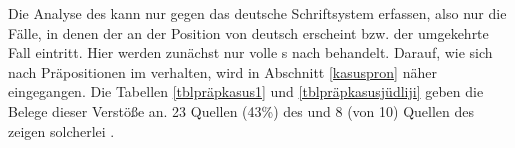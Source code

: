 Die Analyse des \hai{{\LiJi}} kann nur  gegen das deutsche Schriftsystem erfassen, also nur die Fälle, in denen der  an der Position von deutsch  erscheint bzw. der umgekehrte Fall eintritt. Hier werden zunächst nur volle \hai{{\NP}}s nach  behandelt. Darauf, wie sich  nach Präpositionen im \hai{{\LiJi}} verhalten, wird in Abschnitt \ref{kasuspron} näher eingegangen. Die Tabellen \ref{tblpräpkasus1} und \ref{tblpräpkasusjüdliji}  
geben die Belege dieser Verstöße an. 23 Quellen (43\%) des  und 8 (von 10) Quellen des  
zeigen solcherlei . 

 \begin{table} 


\end{table}
